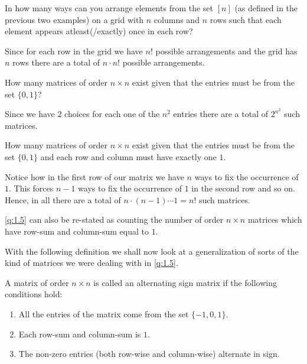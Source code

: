 \begin{question}
In how many ways can you arrange elements from the set $[n]$ (as defined in the previous two examples) on a grid with $n$ columns and $n$ rows such that each element appears atleast(/exactly) once in each row?
\end{question}

    Since for each row in the grid we have $n!$ possible arrangements and the grid has $n$ rows there are a total of $n\cdot n!$ possible arrangements.

\begin{question}
    How many matrices of order $n\times n$ exist given that the entries must be from the set $\{0,1\}$? 
\end{question}
	Since we have $2$ choices for each one of the $n^2$ entries there are a total of $2^{n^2}$ such matrices.

\begin{question}
\label{q:1.5}
	How many matrices of order $n \times n$ exist given that the entries must be from the set $\{0,1\}$ and each row and column must have exactly one $1$.
\end{question}

Notice how in the first row of our matrix we have $n$ ways to fix the occurrence of $1$. This forces $n-1$ ways to fix the occurrence of $1$ in the second row and so on. Hence, in all there are a total of $n\cdot \left( n-1 \right) \cdots 1 = n!$ such matrices.

\begin{remark}
\cref{q:1.5} can also be re-stated as counting the number of order $n\times n$ matrices which have row-sum and column-sum equal to $1$.    
\end{remark}

With the following definition we shall now look at a generalization of sorts of the kind of matrices we were dealing with in \cref{q:1.5}.

\begin{definition}
	A matrix of order $n\times n$ is called an alternating sign matrix if the following conditions hold:
	\begin{enumerate}
		\item All the entries of the matrix come from the set $\{-1,0,1\}$.
		\item Each row-sum and column-sum is $1$.
		\item The non-zero entries (both row-wise and column-wise) alternate in sign.
	\end{enumerate}
\end{definition}

